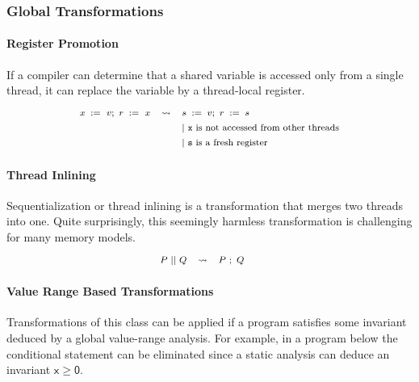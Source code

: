 \subsubsection{Global Transformations}

\paragraph{Register Promotion}

If a compiler can determine that a shared variable 
is accessed only from a single thread, it can replace 
the variable by a thread-local register. 
%
\[\def\arraystretch{1.4}\footnotesize
  \begin{array}{ccl} 

      \writeInst{}{x}{v} \seq \readInst{}{r}{x} 
    & \leadsto 
    & \assignInst{s}{v} \seq \assignInst{r}{s}
    \\ 
    
    & & |~ \text{\texttt{x} is not accessed from other threads} \\
    & & |~ \text{\texttt{s} is a fresh register} \\ 

  \end{array}
\]

\paragraph{Thread Inlining}

Sequentialization or thread inlining 
is a transformation that merges two threads into one.
Quite surprisingly, this seemingly harmless transformation
is challenging for many memory models. 
%
\[\def\arraystretch{1.4}\footnotesize
  \begin{array}{cccl} 

      P \pll Q 
    & \leadsto 
    & P ~\seq Q
    & ~ \\ 
    
  \end{array}
\]


\paragraph{Value Range Based Transformations}

Transformations of this class can be applied 
if a program satisfies some invariant deduced 
by a global value-range analysis. 
For example, in a program below   
the conditional statement can be eliminated 
since a static analysis can deduce an invariant 
$\mathsf{x} \geq \mathsf{0}$.

